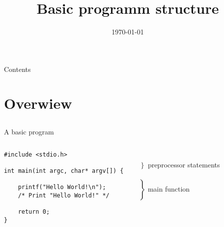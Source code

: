 
\usepackage{ulem}

\newcommand{\topic}{
	Basic programm structure
}
\def\ContinueLineNumber{\lstset{firstnumber=last}}
\def\StartLineAt#1{\lstset{firstnumber=#1}}
\let\numberLineAt\StartLineAt

\makeatletter
\def\beamer@verbatimreadframe{%
	\begingroup%
	\let\do\beamer@makeinnocent\dospecials%
	\count@=127%
	\@whilenum\count@<255 \do{%
		\advance\count@ by 1%
		\catcode\count@=11%
	}%
	\beamer@makeinnocent\^^L%
	\beamer@makeinnocent\^^I%
	\endlinechar`\^^M \catcode`\^^M=12%
	\@ifnextchar\bgroup{\afterassignment\beamer@specialprocessframefirstline\let\beamer@temp=}{\beamer@processframefirstline}}%
\makeatother

\title{\topic}
\supertitle{\course}
\date{\today}



\maketitle

\begin{frame}{Contents}
	\tableofcontents
\end{frame}

\section{Overwiew}
\subsection{}
\begin{frame}[fragile]{A basic program}
	\begin{columns}[T]
		\begin{lstlisting}
#include <stdio.h>

int main(int argc, char* argv[]) {

	printf("Hello World!\n");
	/* Print "Hello World!" */

	return 0;
}
\end{lstlisting}
		
		\ \\$\left. \begin{array}{c}\\\end{array}\right\rbrace $ preprocessor statements
		\ \\\ \\$\left. \begin{array}{c}\\\\\\\\\\\end{array}\right\rbrace $ main function
	\end{columns}
\end{frame}
